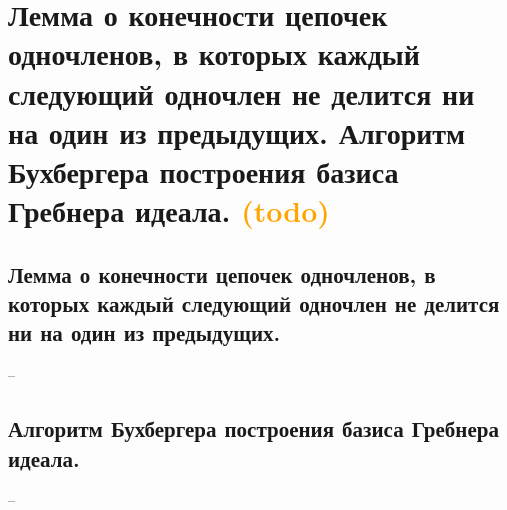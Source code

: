 \section{Лемма о конечности цепочек одночленов, в которых каждый следующий одночлен не делится ни на один из предыдущих. Алгоритм Бухбергера построения базиса Гребнера идеала. \textcolor{orange}{(todo)}}

\subsection{Лемма о конечности цепочек одночленов, в которых каждый следующий одночлен не делится ни на один из предыдущих.}
--

\subsection{Алгоритм Бухбергера построения базиса Гребнера идеала.}
--

